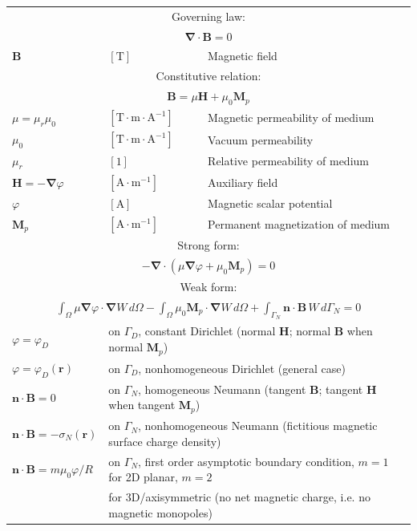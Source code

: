 \documentclass[letterpaper]{article}
\newcommand{\vect}[1]{\mathbf#1}
\newcommand{\nab}{\vect{\nabla}}
\begin{document}
\begin{table}[h!]
\centering
\begin{tabular}{lll}
\hline
\multicolumn{3}{c}{Governing law:} \\
\multicolumn{3}{c}{$\nab\cdot\vect{B}=0$}\\
$\vect{B}$ & $[\text{T}]$ & Magnetic field\\
\hline

\multicolumn{3}{c}{Constitutive relation:} \\
\multicolumn{3}{c}{ $\vect{B}=\mu\vect{H}+\mu_0\vect{M}_{p}$}\\
$\mu=\mu_r\mu_0$ & $[\text{T} \cdot \text{m} \cdot \text{A}^{-1}]$ & Magnetic permeability of medium\\ %
$\mu_0$ &  $[\text{T} \cdot \text{m} \cdot \text{A}^{-1}]$ & Vacuum permeability\\
$\mu_r$ & $[1]$ & Relative permeability of medium\\
$\vect{H}=-\nab \varphi$ & $[\text{A}\cdot \text{m}^{-1}]$ & Auxiliary field\\
$\varphi$ & $[\text{A}]$ & Magnetic scalar potential\\
$\vect{M}_p$ & $[\text{A}\cdot \text{m}^{-1}]$ & Permanent magnetization of medium\\
\hline

\multicolumn{3}{c}{Strong form:} \\[1pt]
\multicolumn{3}{c}{$-\nab\cdot\left(\mu\nab \varphi+\mu_0\vect{M}_{p}\right)=0$}\\[3pt]
\hline

\multicolumn{3}{c}{Weak form:} \\[1pt]
\multicolumn{3}{c}{$\displaystyle\int_\Omega\mu\nab \varphi\cdot\nab W\,d\Omega
-\int_\Omega\mu_0\vect{M}_p\cdot\nab W\,d\Omega
+\int_{\Gamma_N}\vect{n}\cdot\vect{B}\,W\,d{\Gamma_N}
=0$}\\[8pt]
$\varphi=\varphi_D$ & \multicolumn{2}{l}{on $\Gamma_D$, constant Dirichlet (normal $\vect{H}$; normal $\vect{B}$ when normal $\vect{M}_p$)}\\
$\varphi=\varphi_D(\vect{r})$ & \multicolumn{2}{l}{on $\Gamma_D$, nonhomogeneous Dirichlet (general case)}\\
$\vect{n}\cdot\vect{B}=0$ & \multicolumn{2}{l}{on $\Gamma_N$, homogeneous Neumann (tangent $\vect{B}$; tangent $\vect{H}$ when tangent $\vect{M}_p$)}\\
$\vect{n}\cdot\vect{B}=-\sigma_{N}(\vect{r})$ & \multicolumn{2}{l}{on $\Gamma_N$, nonhomogeneous Neumann (fictitious magnetic surface charge density)}\\
$\vect{n}\cdot\vect{B}=m\mu_0\varphi/R$ & \multicolumn{2}{l}{on $\Gamma_N$, first order asymptotic boundary condition, $m=1$ for 2D planar, $m=2$}\\
 & \multicolumn{2}{l}{for 3D/axisymmetric (no net magnetic charge, i.e. no magnetic monopoles)}\\
 

\end{tabular}
\end{table}
\end{document}
